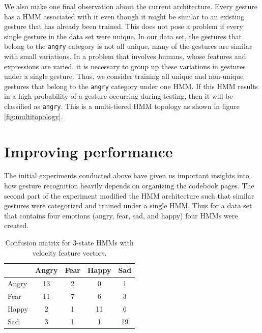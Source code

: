 \documentclass[]{report}   %
\begin{document}
We also make one final observation about the current architecture. Every gesture has a HMM associated with it even though it might be similar to an existing gesture that has already been trained. This does not pose a problem if every single gesture in the data set were unique. In our data set, the gestures that belong to the \texttt{angry} category is not all unique, many of the gestures are similar with small variations. In a problem that involves humans, whose features and expressions are varied, it is necessary to group up these variations in gestures under a single gesture. Thus, we consider training all unique and non-unique gestures that belong to the \texttt{angry} category under one HMM. If this HMM results in a high probability of a gesture occurring during testing, then it will be classified as \texttt{angry}. This is a multi-tiered HMM topology as shown in figure \ref{fig:multitopology}.

\section{Improving performance}
The initial experiments conducted above have given us important insights into how gesture recognition heavily depends on organizing the codebook pages. The second part of the experiment modified the HMM architecture such that similar gestures were categorized and trained under a single HMM. Thus for a data set that contains four emotions (angry, fear, sad, and happy) four HMMs were created. 
     
\begin{table}[htbp]
	\centering
		\begin{tabular}{|l|c|c|c|c|}
		\hline
             & Angry & Fear & Happy & Sad \\ \hline
        Angry & 13     & 2    & 0     & 1   \\ \hline
        Fear  & 11     & 7    & 6     & 3   \\ \hline
        Happy & 2     & 1    & 11    & 6  \\ \hline
        Sad   & 3     & 1    & 1     & 19  \\
		\hline
		\end{tabular}
	\caption{Confusion matrix for 3-state HMMs with velocity feature vectors.}
	\label{tab:dim3state}
\end{table}
\end{document}
